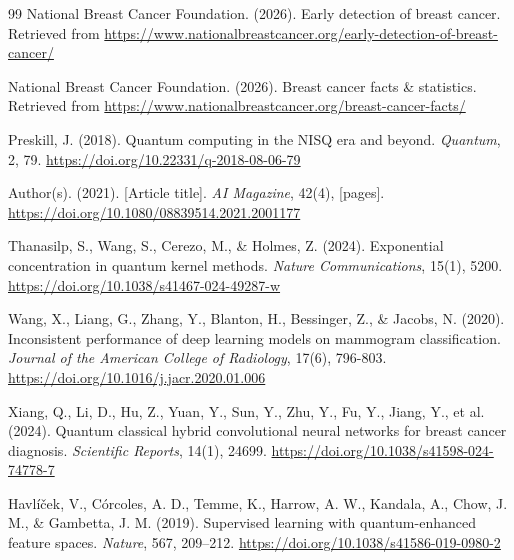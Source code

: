 \begin{thebibliography}{99}
    National Breast Cancer Foundation. (2026). Early detection of breast cancer.
    Retrieved from \url{https://www.nationalbreastcancer.org/early-detection-of-breast-cancer/}


    National Breast Cancer Foundation. (2026). Breast cancer facts \& statistics.
    Retrieved from \url{https://www.nationalbreastcancer.org/breast-cancer-facts/}


    Preskill, J. (2018).
    Quantum computing in the NISQ era and beyond.
    \textit{Quantum}, 2, 79.
    \url{https://doi.org/10.22331/q-2018-08-06-79}

    Author(s). (2021). [Article title]. \textit{AI Magazine}, 42(4), [pages].
    \url{https://doi.org/10.1080/08839514.2021.2001177}


    Thanasilp, S., Wang, S., Cerezo, M., \& Holmes, Z. (2024).
    Exponential concentration in quantum kernel methods.
    \textit{Nature Communications}, 15(1), 5200.
    \url{https://doi.org/10.1038/s41467-024-49287-w}

    Wang, X., Liang, G., Zhang, Y., Blanton, H., Bessinger, Z., \& Jacobs, N. (2020).
    Inconsistent performance of deep learning models on mammogram classification.
    \textit{Journal of the American College of Radiology}, 17(6), 796-803.
    \url{https://doi.org/10.1016/j.jacr.2020.01.006}


    Xiang, Q., Li, D., Hu, Z., Yuan, Y., Sun, Y., Zhu, Y., Fu, Y., Jiang, Y., et al. (2024).
    Quantum classical hybrid convolutional neural networks for breast cancer diagnosis.
    \textit{Scientific Reports}, 14(1), 24699.
    \url{https://doi.org/10.1038/s41598-024-74778-7}


    Havl{\'{i}}{\v{c}}ek, V., C{\'{o}}rcoles, A. D., Temme, K., Harrow, A. W., Kandala, A., Chow, J. M., \& Gambetta, J. M. (2019). Supervised learning with quantum-enhanced feature spaces.
    \textit{Nature}, 567, 209--212.
    \url{https://doi.org/10.1038/s41586-019-0980-2}


\end{thebibliography}
